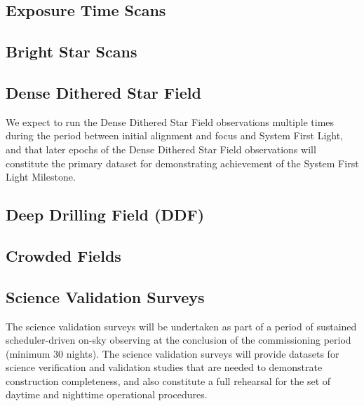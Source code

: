 \documentclass[SE,authoryear,toc,lsstdraft]{lsstdoc}
\begin{document}


\subsection{Exposure Time Scans}



\subsection{Bright Star Scans}



\subsection{Dense Dithered Star Field}

We expect to run the Dense Dithered Star Field observations multiple times during the period between initial alignment and focus and System First Light, and that later epochs of the Dense Dithered Star Field observations will constitute the primary dataset for demonstrating achievement of the System First Light Milestone.



\subsection{Deep Drilling Field (DDF)}



\subsection{Crowded Fields}




\subsection{Science Validation Surveys}

The science validation surveys will be undertaken as part of a period of sustained scheduler-driven on-sky observing at the conclusion of the commissioning period (minimum 30 nights).
The science validation surveys will provide datasets for science verification and validation studies that are needed to demonstrate construction completeness, and also constitute a full rehearsal for the set of daytime and nighttime operational procedures.
\end{document}
